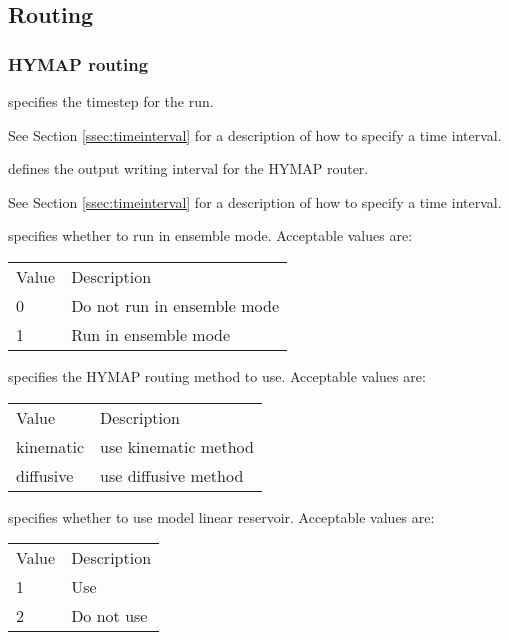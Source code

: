  
 \subsection{Routing} \label{ssec:routing}
 

 
 \subsubsection{HYMAP routing} \label{sssec:hymaprouting}
 

 
  specifies the timestep for
 the run.

 See Section \ref{ssec:timeinterval} for a description
 of how to specify a time interval.

  defines the output
 writing interval for the HYMAP router.

 See Section \ref{ssec:timeinterval} for a description
 of how to specify a time interval.

  specifies whether to run in
 ensemble mode.
 Acceptable values are:

 \begin{tabular}{ll}
 Value & Description                 \\
 0     & Do not run in ensemble mode \\
 1     & Run in ensemble mode        \\
 \end{tabular}

  specifies the HYMAP routing method
 to use.
 Acceptable values are:

 \begin{tabular}{ll}
 Value     & Description          \\
 kinematic & use kinematic method \\
 diffusive & use diffusive method \\
 \end{tabular}

  specifies whether to
 use model linear reservoir.
 Acceptable values are:

 \begin{tabular}{ll}
 Value & Description \\
 1     & Use         \\
 2     & Do not use  \\
 \end{tabular}


